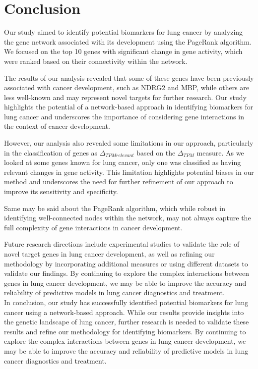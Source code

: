 \section{Conclusion} \label{sec:conclusion}
Our study aimed to identify potential biomarkers for lung cancer by analyzing the gene network associated with its development
using the PageRank algorithm.
We focused on the top 10 genes with significant change in gene activity,
which were ranked based on their connectivity within the network.

The results of our analysis revealed that some of these genes have been previously associated with cancer development,
such as NDRG2 and MBP, while others are less well-known and may represent novel targets for further research.
Our study highlights the potential of a network-based approach in identifying biomarkers for lung cancer and
underscores the importance of considering gene interactions in the context of cancer development.


However, our analysis also revealed some limitations in our approach,
particularly in the classification of genes as $\Delta_{TPM relevant}$ based on the $\Delta_{TPM}$ measure.
As we looked at some genes known for lung cancer, only one was classified as having relevant changes in gene activity.
This limitation highlights potential biases in our method and
underscores the need for further refinement of our approach to improve its sensitivity and specificity.


Same may be said about the PageRank algorithm, which while robust in identifying well-connected nodes within the network,
may not always capture the full complexity of gene interactions in cancer development.


Future research directions include experimental studies to validate the role of novel target genes in lung cancer development,
as well as refining our methodology by incorporating additional measures or
using different datasets to validate our findings.
By continuing to explore the complex interactions between genes in lung cancer development,
we may be able to improve the accuracy and reliability of predictive models in lung cancer diagnostics and treatment.\\

In conclusion, our study has successfully identified potential biomarkers for lung cancer using a network-based approach.
While our results provide insights into the genetic landscape of lung cancer,
further research is needed to validate these results and refine our methodology for identifying biomarkers.
By continuing to explore the complex interactions between genes in lung cancer development,
we may be able to improve the accuracy and reliability of predictive models in lung cancer diagnostics and treatment.